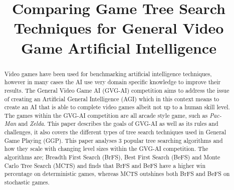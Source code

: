 \documentclass[journal]{IEEEtran}
\begin{document}
%
\title{Comparing Game Tree Search Techniques for General Video Game Artificial Intelligence}
%
%
\author{
}


\maketitle

\begin{abstract}
	Video games have been used for benchmarking artificial intelligence techniques, however in many cases the AI use very domain specific knowledge to improve their results. 
	The General Video Game AI (GVG-AI) competition aims to address the issue of creating an Artificial General Intelligence (AGI) which in this context means to create an AI that is able to complete video games albeit not up to a human skill level. The games within the GVG-AI competition are all arcade style game, such as \textit{Pac-Man} and \textit{Zelda}. 
	This paper describes the goals of GVG-AI as well as its rules and challenges, it also covers the different types of tree search techniques used in General Game Playing (GGP). This paper analyses 3 popular tree searching algorithms and how they scale with changing level sizes within the GVG-AI competition. The algorithms are; Breadth First Search (BrFS), Best First Search (BeFS) and Monte Carlo Tree Search (MCTS) and finds that BrFS and BeFS have a higher win percentage on deterministic games, whereas MCTS outshines both BrFS and BeFS on stochastic games.
	
\end{abstract}
\end{document}
